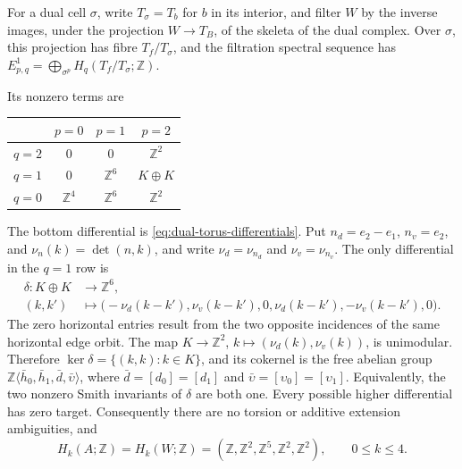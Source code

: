 For a dual cell $\sigma$, write $T_\sigma=T_b$ for $b$ in its interior,
and filter $W$ by the inverse images, under the projection $W\to T_B$, of
the skeleta of the dual complex.  Over $\sigma$, this projection has fibre
$T_f/T_\sigma$, and the filtration spectral sequence has
$E^1_{p,q}=\bigoplus_{\sigma^p}H_q(T_f/T_\sigma;\mathbb Z)$.
\begin{samepage}
Its nonzero terms are
\begin{center}
\begin{tabular}{c@{\quad}ccc}
\toprule
 & $p=0$ & $p=1$ & $p=2$\\
\midrule
$q=2$ & 0 & 0 & $\mathbb Z^2$\\
$q=1$ & 0 & $\mathbb Z^6$ & $K\oplus K$\\
$q=0$ & $\mathbb Z^4$ & $\mathbb Z^6$ & $\mathbb Z^2$\\
\bottomrule
\end{tabular}
\end{center}
\end{samepage}
The bottom differential is \eqref{eq:dual-torus-differentials}.  Put
$n_d=e_2-e_1$, $n_v=e_2$, and $\nu_n(k)=\det(n,k)$, and write
$\nu_d=\nu_{n_d}$ and $\nu_v=\nu_{n_v}$.
The only differential in the $q=1$ row is
\begin{equation*}
 \begin{split}
 \delta:K\oplus K&\longrightarrow\mathbb Z^6,\\
 (k,k')&\longmapsto
 \bigl(-\nu_d(k-k'),\nu_v(k-k'),0,
       \nu_d(k-k'),-\nu_v(k-k'),0\bigr).
 \end{split}
\end{equation*}
The zero horizontal entries result from the two opposite incidences of the
same horizontal edge orbit.  The map
$K\to\mathbb Z^2$, $k\mapsto(\nu_d(k),\nu_v(k))$, is unimodular.
Therefore $\ker\delta=\{(k,k):k\in K\}$, and its cokernel is the free
abelian group
$\mathbb Z\langle\bar h_0,\bar h_1,\bar d,\bar\upsilon\rangle$, where
$\bar d=[d_0]=[d_1]$ and
$\bar\upsilon=[\upsilon_0]=[\upsilon_1]$.
Equivalently, the two nonzero Smith invariants of $\delta$ are both one.
Every possible higher differential has zero target.  Consequently there
are no torsion or additive extension ambiguities, and
\begin{equation}\label{eq:cusp-homology}
 H_k(A;\mathbb Z)=H_k(W;\mathbb Z)=
 (\mathbb Z,\mathbb Z^2,\mathbb Z^5,
   \mathbb Z^2,\mathbb Z^2),\qquad 0\le k\le4.
\end{equation}%

